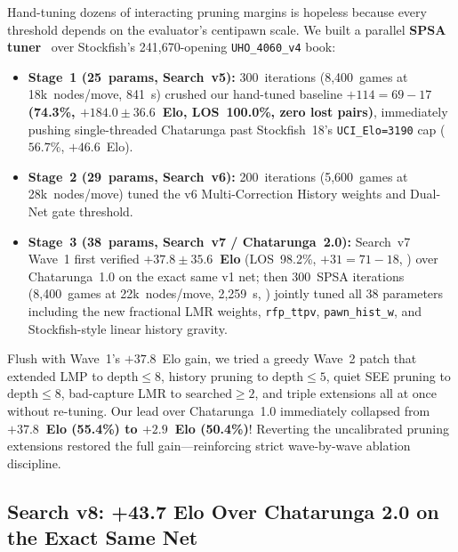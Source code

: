 \documentclass[10.5pt,letterpaper]{article}
\begin{document}
Hand-tuning dozens of interacting pruning margins is hopeless because every threshold depends on the evaluator's centipawn scale. We built a parallel \textbf{SPSA tuner}~\cite{spall1998spsa} over Stockfish's 241,670-opening \texttt{UHO\_4060\_v4} book:
\begin{itemize}
    \item \textbf{Stage~1 (25~params, Search~v5):} 300~iterations (8,400~games at 18k~nodes/move, 841~s) crushed our hand-tuned baseline \textbf{$+114 =69 -17$ (74.3\%, $+184.0 \pm 36.6$~Elo, LOS~100.0\%, zero lost pairs)}, immediately pushing single-threaded Chatarunga past Stockfish~18's \texttt{UCI\_Elo=3190} cap ($56.7\%$, $+46.6$~Elo).
    \item \textbf{Stage~2 (29~params, Search~v6):} 200~iterations (5,600~games at 28k~nodes/move) tuned the v6 Multi-Correction History weights and Dual-Net gate threshold.
    \item \textbf{Stage~3 (38~params, Search~v7 / Chatarunga~2.0):} Search~v7 Wave~1 first verified \textbf{$+37.8 \pm 35.6$~Elo} (LOS~98.2\%, $+31 =71 -18$, ) over Chatarunga~1.0 on the exact same v1 net; then 300~SPSA iterations (8,400~games at 22k~nodes/move, 2,259~s, ) jointly tuned all 38 parameters including the new fractional LMR weights, \texttt{rfp\_ttpv}, \texttt{pawn\_hist\_w}, and Stockfish-style linear history gravity.
\end{itemize}

\begin{failurebox}
Flush with Wave~1's $+37.8$~Elo gain, we tried a greedy Wave~2 patch that extended LMP to $\text{depth} \le 8$, history pruning to $\text{depth} \le 5$, quiet SEE pruning to $\text{depth} \le 8$, bad-capture LMR to $\text{searched} \ge 2$, and triple extensions all at once without re-tuning. Our lead over Chatarunga~1.0 immediately collapsed from \textbf{$+37.8$~Elo (55.4\%) to $+2.9$~Elo (50.4\%)}! Reverting the uncalibrated pruning extensions restored the full gain—reinforcing strict wave-by-wave ablation discipline.
\end{failurebox}

\subsection{Search v8: +43.7 Elo Over Chatarunga 2.0 on the Exact Same Net}
\end{document}
